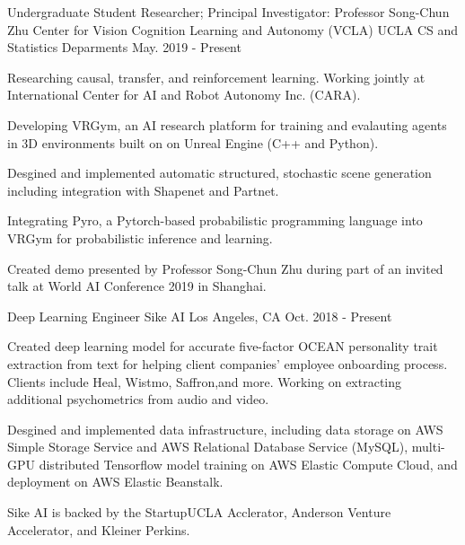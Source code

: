 

\begin{cventries}

  \cventry
    {Undergraduate Student Researcher; Principal Investigator: Professor Song-Chun Zhu} %
    {Center for Vision Cognition Learning and Autonomy (VCLA)} %
    {UCLA CS and Statistics Deparments} %
    {May. 2019 - Present} %
    {
      \begin{cvitems} %
        \item {Researching causal, transfer, and reinforcement learning. Working jointly at International Center for AI and Robot Autonomy Inc. (CARA).}
        \item {Developing VRGym, an AI research platform for training and evalauting agents in
        3D environments built on on Unreal Engine (C++ and Python). } 
        \item {Desgined and implemented automatic structured, stochastic scene generation including integration with Shapenet and Partnet.}
        \item {Integrating Pyro, a Pytorch-based probabilistic programming language into VRGym for probabilistic inference and learning.}
        \item {Created demo presented by Professor Song-Chun Zhu during part of an invited talk at World AI Conference 2019 in Shanghai.}
      \end{cvitems}
    }

  \cventry
    {Deep Learning Engineer} %
    {Sike AI} %
    {Los Angeles, CA} %
    {Oct. 2018 - Present} %
    {
      \begin{cvitems} %
        \item {Created deep learning model for accurate five-factor OCEAN personality trait extraction from text for helping 
        client companies' employee onboarding process. Clients include Heal, Wistmo, Saffron,and more.
        Working on extracting additional psychometrics from audio and video.}
        \item {Desgined and implemented data infrastructure, including data storage on AWS Simple Storage Service
         and AWS Relational Database Service (MySQL), multi-GPU distributed Tensorflow 
         model training on AWS Elastic Compute Cloud, and deployment on AWS Elastic Beanstalk.}
        \item {Sike AI is backed by the StartupUCLA Acclerator, Anderson Venture Accelerator, and Kleiner Perkins.}
      \end{cvitems}
    }


\end{cventries}
